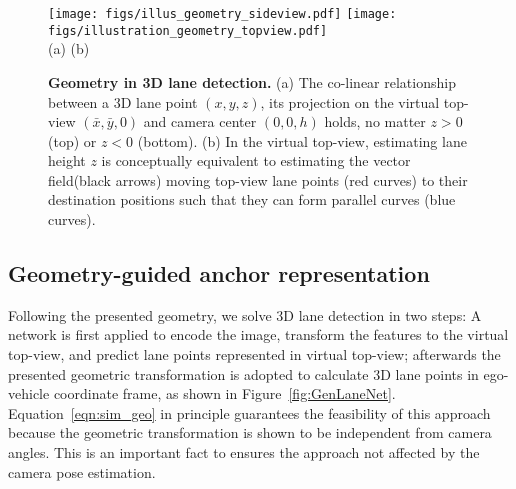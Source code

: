 \documentclass[10pt,twocolumn,letterpaper]{article}
\begin{document}
\begin{figure}[!h]
  \centering
  \texttt{[image: figs/illus\_geometry\_sideview.pdf]}
  \texttt{[image: figs/illustration\_geometry\_topview.pdf]}\\
  \hspace{40pt}(a)  \hspace{100pt}(b)
\caption{\textbf{Geometry in 3D lane detection.} (a) The co-linear relationship between a 3D lane point $(x, y, z)$, its projection on the virtual top-view $(\bar{x}, \bar{y}, 0)$ and camera center $(0, 0, h)$ holds, no matter $z>0$ (top) or $z<0$ (bottom). (b) In the virtual top-view, estimating lane height $z$ is conceptually equivalent to estimating the vector field(black arrows) moving top-view lane points (red curves) to their destination positions such that they can form parallel curves (blue curves).}
  \label{fig:geo:transform}
\end{figure}

\subsection{Geometry-guided anchor representation}
\label{sec:sub:geo_anchor}

Following the presented geometry, we solve 3D lane detection in two steps: A network is first applied to encode the image, transform the features to the virtual top-view, and predict lane points represented in virtual top-view; afterwards the presented geometric transformation is adopted to calculate 3D lane points in ego-vehicle coordinate frame, as shown in Figure~\ref{fig:GenLaneNet}. Equation~\ref{eqn:sim_geo} in principle guarantees the feasibility of this approach because the geometric transformation is shown to be independent from camera angles. This is an important fact to ensures the approach not affected by the camera pose estimation.
 
\end{document}
